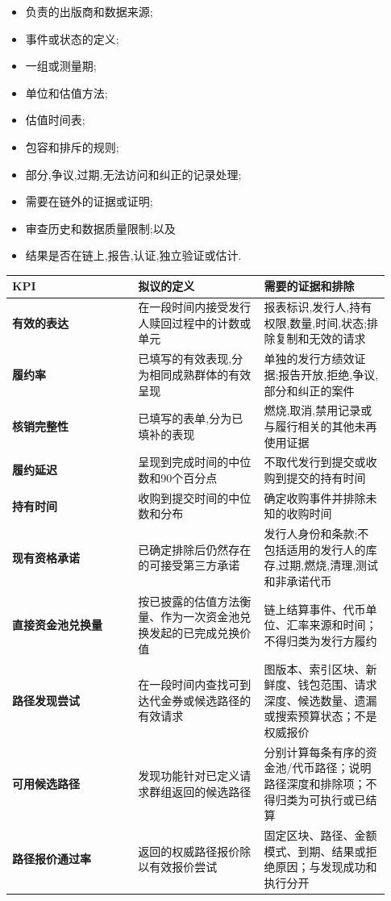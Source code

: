 \documentclass[11pt]{article}
\begin{document}
\begin{itemize}[leftmargin=*]
\item 负责的出版商和数据来源;
\item 事件或状态的定义;
\item 一组或测量期;
\item 单位和估值方法;
\item 估值时间表;
\item 包容和排斥的规则;
\item 部分,争议,过期,无法访问和纠正的记录处理;
\item 需要在链外的证据或证明;
\item 审查历史和数据质量限制;以及
\item 结果是否在链上,报告,认证,独立验证或估计.
\end{itemize}
\begin{longtable}{P{0.31\linewidth} P{0.31\linewidth} P{0.31\linewidth}}
\toprule
KPI & 拟议的定义 & 需要的证据和排除 \\
\midrule
\endhead
\textbf{有效的表达} & 在一段时间内接受发行人赎回过程中的计数或单元 & 报表标识,发行人,持有权限,数量,时间,状态;排除复制和无效的请求 \\
\textbf{履约率} & 已填写的有效表现,分为相同成熟群体的有效呈现 & 单独的发行方绩效证据;报告开放,拒绝,争议,部分和纠正的案件 \\
\textbf{核销完整性} & 已填写的表单,分为已填补的表现 & 燃烧,取消,禁用记录或与履行相关的其他未再使用证据 \\
\textbf{履约延迟} & 呈现到完成时间的中位数和90个百分点 & 不取代发行到提交或收购到提交的持有时间 \\
\textbf{持有时间} & 收购到提交时间的中位数和分布 & 确定收购事件并排除未知的收购时间 \\
\textbf{现有资格承诺} & 已确定排除后仍然存在的可接受第三方承诺 & 发行人身份和条款;不包括适用的发行人的库存,过期,燃烧,清理,测试和非承诺代币 \\
\textbf{直接资金池兑换量} & 按已披露的估值方法衡量、作为一次资金池兑换发起的已完成兑换价值 & 链上结算事件、代币单位、汇率来源和时间；不得归类为发行方履约 \\
\textbf{路径发现尝试} & 在一段时间内查找可到达代金券或候选路径的有效请求 & 图版本、索引区块、新鲜度、钱包范围、请求深度、候选数量、遗漏或搜索预算状态；不是权威报价 \\
\textbf{可用候选路径} & 发现功能针对已定义请求群组返回的候选路径 & 分别计算每条有序的资金池/代币路径；说明路径深度和排除项；不得归类为可执行或已结算 \\
\textbf{路径报价通过率} & 返回的权威路径报价除以有效报价尝试 & 固定区块、路径、金额模式、到期、结果或拒绝原因；与发现成功和执行分开 \\

\end{longtable}
\end{document}
